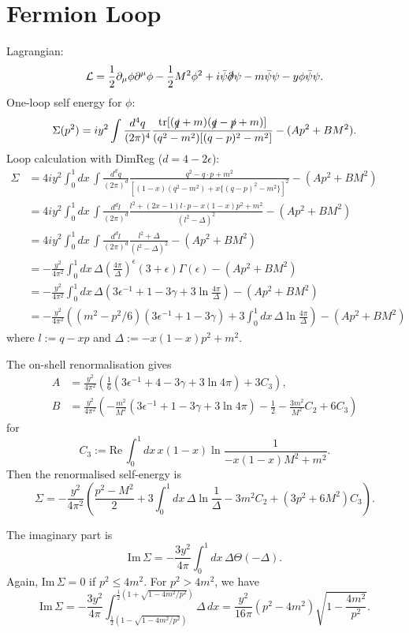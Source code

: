 \documentclass[11pt]{article}
\theoremstyle{definition}
\theoremstyle{remark}
\begin{document}
	\section{Fermion Loop}
	Lagrangian:
	\[\mathcal{L}=\frac{1}{2}\partial_{\mu}\phi\partial^{\mu}\phi-\frac{1}{2}M^{2}\phi^{2}+i\bar{\psi}\slashed{\partial}\psi-m\bar{\psi}\psi-y\phi\bar{\psi}\psi.\]
	One-loop self energy for $\phi$:
	\[\Sigma(p^{2})=iy^{2}\int\frac{d^{4}q}{(2\pi)^{4}}\frac{\mathrm{tr}[(\slashed{q}+m)(\slashed{q}-\slashed{p}+m)]}{(q^{2}-m^{2})[(q-p)^{2}-m^{2}]}-(Ap^{2}+BM^{2}).\]
	Loop calculation with DimReg ($d=4-2\epsilon$):
	\begin{align*}
		\Sigma&=4iy^{2}\int_{0}^{1}dx\,\int\frac{d^{d}q}{(2\pi)^{d}}\frac{q^{2}-q\cdot p+m^{2}}{[(1-x)(q^{2}-m^{2})+x\{(q-p)^{2}-m^{2}\}]^{2}}-(Ap^{2}+BM^{2})\\
		&=4iy^{2}\int_{0}^{1}dx\,\int\frac{d^{d}l}{(2\pi)^{d}}\frac{l^{2}+(2x-1)l\cdot p-x(1-x)p^{2}+m^{2}}{(l^{2}-\Delta)^{2}}-(Ap^{2}+BM^{2})\\
		&=4iy^{2}\int_{0}^{1}dx\,\int\frac{d^{d}l}{(2\pi)^{d}}\frac{l^{2}+\Delta}{(l^{2}-\Delta)^{2}}-(Ap^{2}+BM^{2})\\
		&=-\frac{y^{2}}{4\pi^{2}}\int_{0}^{1}dx\,\Delta\left(\frac{4\pi}{\Delta}\right)^{\epsilon}(3+\epsilon)\Gamma(\epsilon)-(Ap^{2}+BM^{2})\\
		&=-\frac{y^{2}}{4\pi^{2}}\int_{0}^{1}dx\,\Delta\left(3\epsilon^{-1}+1-3\gamma+3\ln\frac{4\pi}{\Delta}\right)-(Ap^{2}+BM^{2})\\
		&=-\frac{y^{2}}{4\pi^{2}}\left((m^{2}-p^{2}/6)(3\epsilon^{-1}+1-3\gamma)+3\int_{0}^{1}dx\,\Delta\ln\frac{4\pi}{\Delta}\right)-(Ap^{2}+BM^{2})
	\end{align*}
	where $l:=q-xp$ and $\Delta:=-x(1-x)p^{2}+m^{2}$.
	
	The on-shell renormalisation gives
	\begin{align*}
		A&=\frac{y^{2}}{4\pi^{2}}\left(\frac{1}{6}(3\epsilon^{-1}+4-3\gamma+3\ln4\pi)+3C_{3}\right),\\
		B&=\frac{y^{2}}{4\pi^{2}}\left(-\frac{m^{2}}{M^{2}}(3\epsilon^{-1}+1-3\gamma+3\ln4\pi)-\frac{1}{2}-\frac{3m^{2}}{M^{2}}C_{2}+6C_{3}\right)
	\end{align*}
	for
	\[C_{3}:=\mathrm{Re}\,\int_{0}^{1}dx\,x(1-x)\ln\frac{1}{-x(1-x)M^{2}+m^{2}}.\]
	Then the renormalised self-energy is
	\[\Sigma=-\frac{y^{2}}{4\pi^{2}}\left(\frac{p^{2}-M^{2}}{2}+3\int_{0}^{1}dx\,\Delta\ln\frac{1}{\Delta}-3m^{2}C_{2}+(3p^{2}+6M^{2})C_{3}\right).\]
	
	The imaginary part is
	\[\mathrm{Im}\,\Sigma=-\frac{3y^{2}}{4\pi}\int_{0}^{1}dx\,\Delta\Theta(-\Delta).\]
	Again, $\mathrm{Im}\,\Sigma=0$ if $p^{2}\leq4m^{2}$.
	For $p^{2}>4m^{2}$, we have
	\[\mathrm{Im}\,\Sigma=-\frac{3y^{2}}{4\pi}\int_{\frac{1}{2}(1-\sqrt{1-4m^{2}/p^{2}})}^{\frac{1}{2}(1+\sqrt{1-4m^{2}/p^{2}})}\Delta\,dx=\frac{y^{2}}{16\pi}(p^{2}-4m^{2})\sqrt{1-\frac{4m^{2}}{p^{2}}}.\]
	
\end{document}
